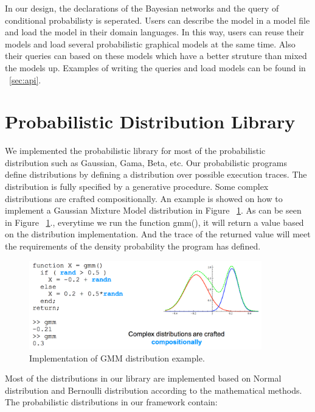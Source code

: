In our design, the declarations of the Bayesian networks and the query of conditional probabilisty is seperated. Users can describe the model in a model file and load the model in their domain languages. In this way, users can reuse their models and load several probabilistic graphical models at the same time. Also their queries can based on these models which have a better struture than mixed the models up. Examples of writing the queries and load models can be found in ~\ref{sec:api}.

\section{Probabilistic Distribution Library}
\label{sec:distr}
We implemented the probabilistic library for most of the probabilistic distribution such as Gaussian, Gama, Beta, etc. Our probabilistic programs define distributions by defining a distribution over possible execution traces. The distribution is fully specified by a generative procedure. Some complex distributions are crafted compositionally. An example is showed on how to implement a Gaussian Mixture Model distribution in Figure ~\ref{fig:gmm}. As can be seen in Figure ~\ref{fig:gmm}., everytime we run the function gmm(), it will return a value based on the distribution implementation. And the trace of the returned value will meet the requirements of the density probability the program has defined.

\begin{figure}
    \centering
    \includegraphics[width=0.9\textwidth]{figures/gmm.png}
    \caption{Implementation of GMM distribution example.}
    \label{fig:gmm}
\end{figure}

Most of the distributions in our library are implemented based on Normal distribution and Bernoulli distribution according to the mathematical methods. The probabilistic distributions in our framework contain:

